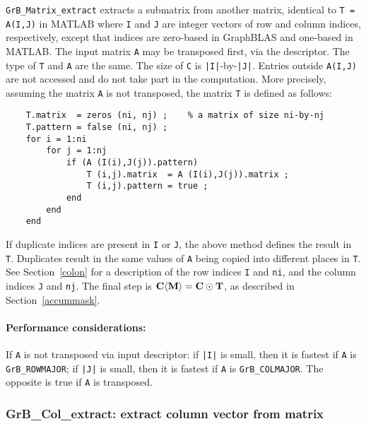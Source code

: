 \documentclass[12pt]{article}
\begin{document}
\verb'GrB_Matrix_extract' extracts a submatrix from another matrix, identical
to \verb'T = A(I,J)' in MATLAB where \verb'I' and \verb'J' are integer vectors
of row and column indices, respectively, except that indices are zero-based in
GraphBLAS and one-based in MATLAB.  The input matrix \verb'A' may be transposed
first, via the descriptor.  The type of \verb'T' and \verb'A' are the same.
The size of \verb'C' is \verb'|I|'-by-\verb'|J|'.
Entries outside \verb'A(I,J)' are not accessed and do not take part in the
computation.  More precisely, assuming the matrix \verb'A' is not transposed,
the matrix \verb'T' is defined as follows:

    \vspace{-0.1in}
    {\footnotesize
    \begin{verbatim}
    T.matrix  = zeros (ni, nj) ;    % a matrix of size ni-by-nj
    T.pattern = false (ni, nj) ;
    for i = 1:ni
        for j = 1:nj
            if (A (I(i),J(j)).pattern)
                T (i,j).matrix  = A (I(i),J(j)).matrix ;
                T (i,j).pattern = true ;
            end
        end
    end \end{verbatim}}

\vspace{-0.1in}
If duplicate indices are present in \verb'I' or \verb'J', the above method
defines the result in \verb'T'.  Duplicates result in the same values of
\verb'A' being copied into different places in \verb'T'.
See Section~\ref{colon} for a description of the row indices
\verb'I' and \verb'ni', and the column indices
\verb'J' and \verb'nj'.
The final step is ${\bf C \langle M \rangle  = C \odot
T}$, as described in Section~\ref{accummask}.

\paragraph{\bf Performance considerations:} %
If \verb'A' is not transposed via input descriptor: if \verb'|I|' is small,
then it is fastest if \verb'A' is \verb'GrB_ROWMAJOR'; if
\verb'|J|' is small, then it is fastest if \verb'A' is
\verb'GrB_COLMAJOR'.  The opposite is true if \verb'A' is transposed.

\newpage
\subsubsection{{\sf GrB\_Col\_extract:} extract column vector from matrix}
\label{extract_column}
\end{document}
